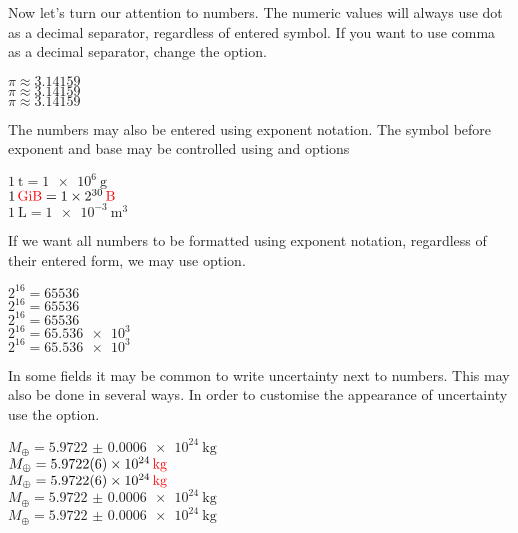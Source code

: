 Now let's turn our attention to numbers. The numeric values will always use dot
as a decimal separator, regardless of entered symbol. If you want to use comma
as a decimal separator, change the  option.
\begin{example}
\(\pi \approx \num{3.14159}\)
\\ %
\(\pi \approx \num{3,14159}\)
\\ %
\(\pi \approx \num[
  output-decimal-marker={,}
]{3.14159}\)
\end{example}

The numbers may also be entered using exponent notation. The symbol before
exponent and base may be controlled using  and
 options
\begin{example}
\(\qty{1}{\tonne} 
  = \qty{1e6}{\g}\) \\
\(\qty{1}{\gibi\byte} = \qty[
  exponent-base = 2,
]{1e30}{\byte}\) \\
\(\qty{1}{\L} = \qty[
  exponent-product = \cdot,
]{1e-3}{\cubic\m}\)
\end{example}

If we want all numbers to be formatted using exponent notation, regardless of
their entered form, we may use  option.
\begin{example}
\(2^{16} = \num{65536}\) \\
\(2^{16} = \num[
  exponent-mode = scientific,
]{65536}\) \\
\(2^{16} = \num[
  exponent-mode = engineering,
]{65536}\) \\
\(2^{16} = \num[
  exponent-mode = fixed,
]{65.536e3}\) \\
\(2^{16} = \num[
  exponent-mode = fixed,
  fixed-exponent = 5,
]{65.536e3}\)
\end{example}

In some fields it may be common to write uncertainty next to numbers. This may
also be done in several ways. In order to customise the appearance of
uncertainty use the  option.
\begin{example}
\(M_\oplus = \qty{
  5.9722(6) e24}{\kg}\)
  \\ %
\(M_\oplus = \qty{
  5.9722 +- 0.0006 e24}{\kg}\)
  \\ %
\(M_\oplus = \qty{
  5.9722 \pm 0.0006 e24}{\kg}\)
  \\ %
\(M_\oplus = \qty[
    uncertainty-mode = separate
  ]{5.9722(6) e24}{\kg}\)
  \\ %
\(M_\oplus = \qty[
  uncertainty-mode = full
]{5.9722(6) e24}{\kg}\)
\end{example}

